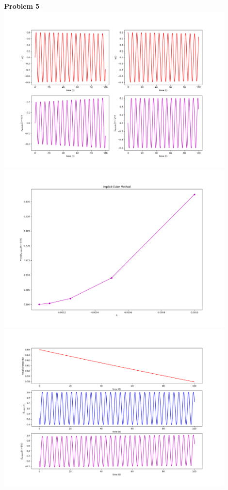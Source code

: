 \documentclass[12pt]{article}
\begin{document}
	\indent\textbf{Problem 5}\\
		\includegraphics[width=0.9\textwidth]{implicitPlot.png}\\
		\includegraphics[width=0.9\textwidth]{errorImplicitPlot.png}\\
		\includegraphics[width=0.9\textwidth]{energyImplicitPlot.png}\\
\end{document}
